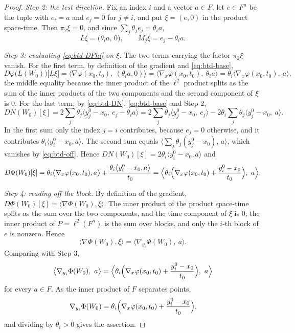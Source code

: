 \begin{proof}
\emph{Step 2: the test direction.}
Fix an index $i$ and a vector $a\in F$, let $e\in F^n$ be the tuple with $e_i=a$ and
$e_j=0$ for $j\neq i$, and put $\xi=(e,0)$ in the product space-time. Then
$\pi_2\xi=0$, and since $\sum_j\theta_je_j=\theta_ia$,
\[
  L\xi=\bigl(\theta_ia,\,0\bigr),\qquad
  M_j\xi=e_j-\theta_ia .
\]

\emph{Step 3: evaluating \eqref{eq:btd-DPhi} on $\xi$.}
The two terms carrying the factor $\pi_2\xi$ vanish. For the first term, by definition of
the gradient and \eqref{eq:btd-base},
\[
  D\varphi\bigl(L(W_0)\bigr)\bigl[L\xi\bigr]
   =\bigl\langle\nabla\varphi(x_0,t_0),\ (\theta_ia,0)\bigr\rangle
   =\bigl\langle\nabla_x\varphi(x_0,t_0),\ \theta_ia\bigr\rangle
   =\theta_i\bigl\langle\nabla_x\varphi(x_0,t_0),\ a\bigr\rangle,
\]
the middle equality because the inner product of the $\ell^2$ product splits as the sum
of the inner products of the two components and the second component of $\xi$ is $0$.
For the last term, by \eqref{eq:btd-DN}, \eqref{eq:btd-base} and Step 2,
\[
  DN(W_0)[\xi]
   =2\sum_j\theta_j\bigl\langle y^0_j-x_0,\ e_j-\theta_ia\bigr\rangle
   =2\sum_j\theta_j\bigl\langle y^0_j-x_0,\ e_j\bigr\rangle
     -2\theta_i\sum_j\theta_j\bigl\langle y^0_j-x_0,\ a\bigr\rangle .
\]
In the first sum only the index $j=i$ contributes, because $e_j=0$ otherwise, and it
contributes $\theta_i\langle y^0_i-x_0,a\rangle$. The second sum equals
$\bigl\langle\sum_j\theta_j(y^0_j-x_0),\,a\bigr\rangle$, which vanishes by
\eqref{eq:btd-off}. Hence $DN(W_0)[\xi]=2\theta_i\langle y^0_i-x_0,a\rangle$ and
\[
  D\Phi(W_0)[\xi]
   =\theta_i\bigl\langle\nabla_x\varphi(x_0,t_0),a\bigr\rangle
     +\frac{\theta_i\bigl\langle y^0_i-x_0,a\bigr\rangle}{t_0}
   =\Bigl\langle\theta_i\Bigl(\nabla_x\varphi(x_0,t_0)+\frac{y^0_i-x_0}{t_0}\Bigr),\ a
     \Bigr\rangle .
\]

\emph{Step 4: reading off the block.}
By definition of the gradient, $D\Phi(W_0)[\xi]=\langle\nabla\Phi(W_0),\xi\rangle$. The
inner product of the product space-time splits as the sum over the two components, and
the time component of $\xi$ is $0$; the inner product of $P=\ell^2(F^n)$ is the sum over
blocks, and only the $i$-th block of $e$ is nonzero. Hence
\[
  \bigl\langle\nabla\Phi(W_0),\xi\bigr\rangle
   =\bigl\langle\nabla_{y_i}\Phi(W_0),\ a\bigr\rangle .
\]
Comparing with Step 3,
\[
  \bigl\langle\nabla_{y_i}\Phi(W_0),\ a\bigr\rangle
   =\Bigl\langle\theta_i\Bigl(\nabla_x\varphi(x_0,t_0)+\frac{y^0_i-x_0}{t_0}\Bigr),\ a
     \Bigr\rangle
\]
for every $a\in F$. As the inner product of $F$ separates points,
\[
  \nabla_{y_i}\Phi(W_0)
    =\theta_i\Bigl(\nabla_x\varphi(x_0,t_0)+\frac{y^0_i-x_0}{t_0}\Bigr),
\]
and dividing by $\theta_i>0$ gives the assertion.
\end{proof}
